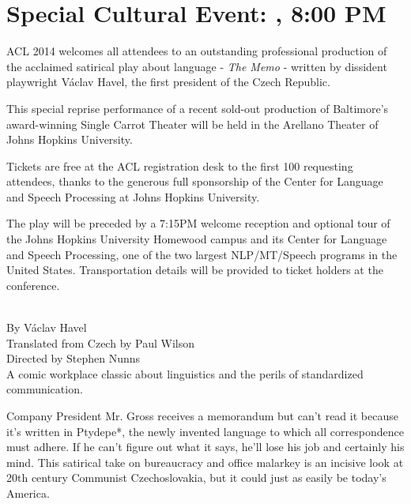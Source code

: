 \clearpage
\section*{Special Cultural Event: \daydate, 8:00 PM}

ACL 2014 welcomes all attendees to an outstanding professional production of the acclaimed satirical play about language - {\it The Memo} - written by dissident playwright V\'{a}clav Havel, the first president of the Czech Republic.

This special reprise performance of a recent sold-out production of Baltimore's award-winning Single Carrot Theater will be held in the Arellano Theater of Johns Hopkins University.

Tickets are free at the ACL registration desk to the first 100 requesting attendees, thanks to the generous full sponsorship of the Center for Language and Speech Processing at Johns Hopkins University.

The play will be preceded by a 7:15PM welcome reception and optional tour of the Johns Hopkins University Homewood campus and its Center for Language and Speech Processing, one of the two largest NLP/MT/Speech programs in the United States.  Transportation details will be provided to ticket holders at the conference.

\noindent\makebox[\linewidth]{\rule{4in}{0.4pt}}

 \\
\noindent By Václav Havel \\

\noindent Translated from Czech by Paul Wilson \\
\noindent Directed by Stephen Nunns \\

A comic workplace classic about linguistics and the perils of standardized communication.

Company President Mr. Gross receives a memorandum but can’t read it because it’s written in Ptydepe*, the newly invented language to which all correspondence must adhere. If he can’t figure out what it says, he’ll lose his job and certainly his mind. This satirical take on bureaucracy and office malarkey is an incisive look at 20th century Communist Czechoslovakia, but it could just as easily be today’s America.

